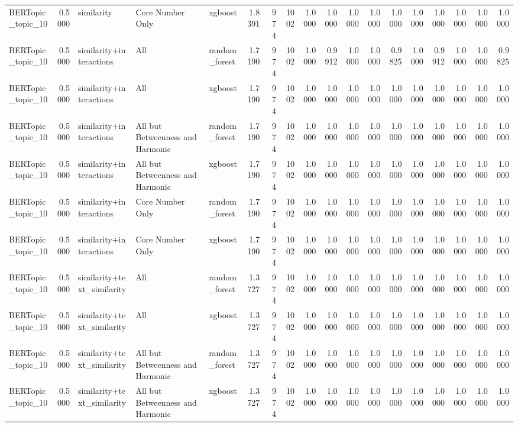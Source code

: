 \begin{tabular}{lrlllrrrrrrrrrrrrr}
BERTopic_topic_10 & 0.5000 & similarity & Core Number Only & xgboost & 1.8391 & 974 & 1002 & 1.0000 & 1.0000 & 1.0000 & 1.0000 & 1.0000 & 1.0000 & 1.0000 & 1.0000 & 1.0000 & 1.0000 \\
BERTopic_topic_10 & 0.5000 & similarity+interactions & All & random_forest & 1.7190 & 974 & 1002 & 1.0000 & 0.9912 & 1.0000 & 1.0000 & 0.9825 & 1.0000 & 0.9912 & 1.0000 & 1.0000 & 0.9825 \\
BERTopic_topic_10 & 0.5000 & similarity+interactions & All & xgboost & 1.7190 & 974 & 1002 & 1.0000 & 1.0000 & 1.0000 & 1.0000 & 1.0000 & 1.0000 & 1.0000 & 1.0000 & 1.0000 & 1.0000 \\
BERTopic_topic_10 & 0.5000 & similarity+interactions & All but Betweenness and Harmonic & random_forest & 1.7190 & 974 & 1002 & 1.0000 & 1.0000 & 1.0000 & 1.0000 & 1.0000 & 1.0000 & 1.0000 & 1.0000 & 1.0000 & 1.0000 \\
BERTopic_topic_10 & 0.5000 & similarity+interactions & All but Betweenness and Harmonic & xgboost & 1.7190 & 974 & 1002 & 1.0000 & 1.0000 & 1.0000 & 1.0000 & 1.0000 & 1.0000 & 1.0000 & 1.0000 & 1.0000 & 1.0000 \\
BERTopic_topic_10 & 0.5000 & similarity+interactions & Core Number Only & random_forest & 1.7190 & 974 & 1002 & 1.0000 & 1.0000 & 1.0000 & 1.0000 & 1.0000 & 1.0000 & 1.0000 & 1.0000 & 1.0000 & 1.0000 \\
BERTopic_topic_10 & 0.5000 & similarity+interactions & Core Number Only & xgboost & 1.7190 & 974 & 1002 & 1.0000 & 1.0000 & 1.0000 & 1.0000 & 1.0000 & 1.0000 & 1.0000 & 1.0000 & 1.0000 & 1.0000 \\
BERTopic_topic_10 & 0.5000 & similarity+text_similarity & All & random_forest & 1.3727 & 974 & 1002 & 1.0000 & 1.0000 & 1.0000 & 1.0000 & 1.0000 & 1.0000 & 1.0000 & 1.0000 & 1.0000 & 1.0000 \\
BERTopic_topic_10 & 0.5000 & similarity+text_similarity & All & xgboost & 1.3727 & 974 & 1002 & 1.0000 & 1.0000 & 1.0000 & 1.0000 & 1.0000 & 1.0000 & 1.0000 & 1.0000 & 1.0000 & 1.0000 \\
BERTopic_topic_10 & 0.5000 & similarity+text_similarity & All but Betweenness and Harmonic & random_forest & 1.3727 & 974 & 1002 & 1.0000 & 1.0000 & 1.0000 & 1.0000 & 1.0000 & 1.0000 & 1.0000 & 1.0000 & 1.0000 & 1.0000 \\
BERTopic_topic_10 & 0.5000 & similarity+text_similarity & All but Betweenness and Harmonic & xgboost & 1.3727 & 974 & 1002 & 1.0000 & 1.0000 & 1.0000 & 1.0000 & 1.0000 & 1.0000 & 1.0000 & 1.0000 & 1.0000 & 1.0000 \\

\end{tabular}
